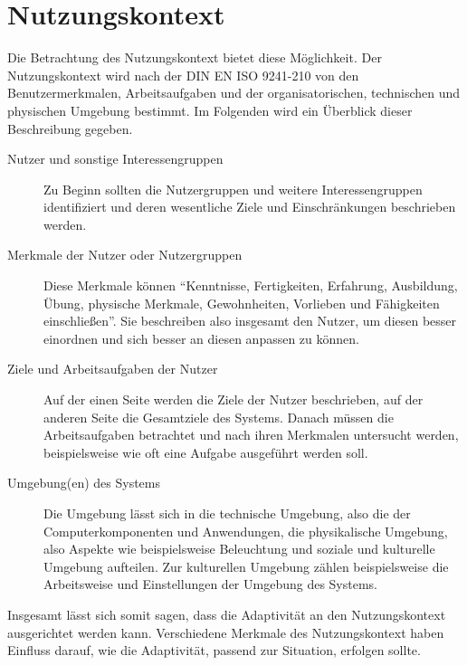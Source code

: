 \documentclass[12pt, paper=a4, bibtotoc, toc=listof, headsepline=true, numbers=endperiod]{scrreprt}
\begin{document}
	\section{Nutzungskontext}
	Die Betrachtung des Nutzungskontext bietet diese Möglichkeit. Der Nutzungskontext wird nach der DIN EN ISO 9241-210 von den Benutzermerkmalen, Arbeitsaufgaben und der organisatorischen, technischen und physischen Umgebung bestimmt. Im Folgenden wird ein Überblick dieser Beschreibung gegeben\cite[S.15 ff.]{hoffmann2014venus}.
	\begin{description}  
		\item  [Nutzer und sonstige Interessengruppen] 
		Zu Beginn sollten die Nutzergruppen und weitere Interessengruppen identifiziert und deren wesentliche Ziele und Einschränkungen beschrieben werden.
			
		\item [Merkmale der Nutzer oder Nutzergruppen]
		Diese Merkmale können \enquote{Kenntnisse, Fertigkeiten, Erfahrung, Ausbildung, Übung, physische Merkmale, Gewohnheiten, Vorlieben und Fähigkeiten einschließen}\cite[S.16 ]{hoffmann2014venus}. Sie beschreiben also insgesamt den Nutzer, um diesen besser einordnen und sich besser an diesen anpassen zu können.
		
		\item  [Ziele und Arbeitsaufgaben der Nutzer]
		Auf der einen Seite werden die Ziele der Nutzer beschrieben, auf der anderen Seite die Gesamtziele des Systems. Danach müssen die Arbeitsaufgaben betrachtet und nach ihren Merkmalen untersucht werden, beispielsweise wie oft eine Aufgabe ausgeführt werden soll.
			
		\item [Umgebung(en) des Systems]
		Die Umgebung lässt sich in die technische Umgebung, also die der Computerkomponenten und Anwendungen, die physikalische Umgebung, also Aspekte wie beispielsweise Beleuchtung und soziale und kulturelle Umgebung aufteilen. Zur kulturellen Umgebung zählen beispielsweise die Arbeitsweise und Einstellungen der Umgebung des Systems.
	\end{description}
	Insgesamt lässt sich somit sagen, dass die Adaptivität an den Nutzungskontext ausgerichtet werden kann. Verschiedene Merkmale des Nutzungskontext haben Einfluss darauf, wie die Adaptivität, passend zur Situation, erfolgen sollte.
\end{document}
